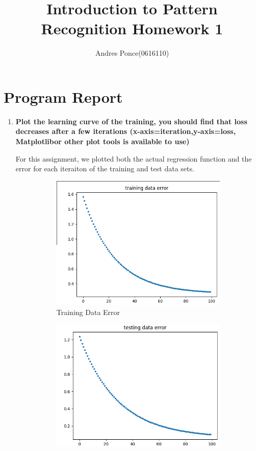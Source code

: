 \documentclass{article}
\title{Introduction to Pattern Recognition Homework 1}
\author{Andres Ponce(0616110)}
\begin{document}
\maketitle

\section{Program Report} %
\begin{enumerate}
		\item \textbf{Plot the learning curve of the training, you should 
				find that loss decreases after a few iterations 
				(x-axis=iteration,y-axis=loss, Matplotlibor other plot tools is available to use)}

				For this assignment, we plotted both the actual regression function and the error
				for each iteraiton of the training and test data sets.
				\begin{figure}
					\centering
						\begin{subfigure}[b]{0.3\linewidth}
								\centering
								\includegraphics[width=\textwidth]{training_data_error.png}
								\caption{Training Data Error} 
						\end{subfigure}
						\begin{subfigure}[b]{0.3\linewidth}
								\centering
								\includegraphics[width=\textwidth]{testing_data_error.png}

\end{subfigure}
\end{figure}
\end{enumerate}
\end{document}
